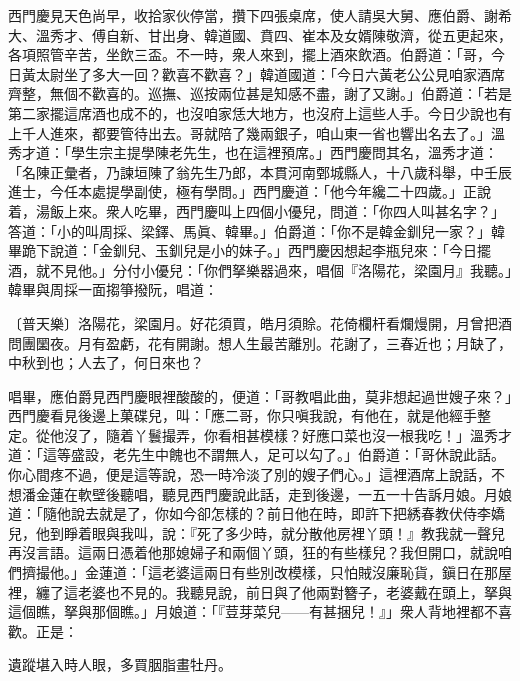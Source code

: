 西門慶見天色尚早，收拾家伙停當，攢下四張桌席，使人請吳大舅、應伯爵、謝希大、溫秀才、傅自新、甘出身、韓道國、賁四、崔本及女婿陳敬濟，從五更起來，各項照管辛苦，坐飲三盃。不一時，衆人來到，擺上酒來飲酒。伯爵道：「哥，今日黃太尉坐了多大一回？歡喜不歡喜？」韓道國道：「今日六黃老公公見咱家酒席齊整，無個不歡喜的。巡撫、巡按兩位甚是知感不盡，謝了又謝。」伯爵道：「若是第二家擺這席酒也成不的，也沒咱家恁大地方，也沒府上這些人手。今日少說也有上千人進來，都要管待出去。哥就陪了幾兩銀子，咱山東一省也響出名去了。」溫秀才道：「學生宗主提學陳老先生，也在這裡預席。」{}西門慶問其名，溫秀才道：「名陳正彙者，乃諫垣陳了翁先生乃郎，本貫河南鄄城縣人，十八歲科舉，中壬辰進士，今任本處提學副使，極有學問。」西門慶道：「他今年纔二十四歲。」正說着，湯飯上來。衆人吃畢，西門慶叫上四個小優兒，問道：「你四人叫甚名字？」答道：「小的叫周採、梁鐸、馬眞、韓畢。」伯爵道：「你不是韓金釧兒一家？」韓畢跪下說道：「金釧兒、玉釧兒是小的妹子。」西門慶因想起李瓶兒來：「今日擺酒，就不見他。」分付小優兒：「你們拏樂器過來，唱個『洛陽花，梁園月』我聽。」韓畢與周採一面搊箏撥阮，唱道：

\begin{myquote} 
{\markfont\small{〔普天樂〕}}洛陽花，梁園月。好花須買，皓月須賒。花倚欄杆看爛熳開，月曾把酒問團圞夜。月有盈虧，花有開謝。想人生最苦離別。花謝了，三春近也；月缺了，中秋到也；人去了，何日來也？{}
\end{myquote} 

唱畢，應伯爵見西門慶眼裡酸酸的，便道：「哥教唱此曲，莫非想起過世嫂子來？」西門慶看見後邊上菓碟兒，叫：「應二哥，你只嗔我說，有他在，就是他經手整定。從他沒了，隨着丫鬟撮弄，你看相甚模樣？好應口菜也沒一根我吃！」{}溫秀才道：「這等盛設，老先生中餽也不謂無人，足可以勾了。」伯爵道：「哥休說此話。你心間疼不過，便是這等說，恐一時冷淡了別的嫂子們心。」{}這裡酒席上說話，不想潘金蓮在軟壁後聽唱，聽見西門慶說此話，走到後邊，一五一十告訴月娘。月娘道：「隨他說去就是了，你如今卻怎樣的？前日他在時，即許下把綉春教伏侍李嬌兒，他到睜着眼與我叫，說：『死了多少時，就分散他房裡丫頭！』教我就一聲兒再沒言語。這兩日憑着他那媳婦子和兩個丫頭，狂的有些樣兒？我但開口，就說咱們擠撮他。」金蓮道：「這老婆這兩日有些別改模樣，只怕賊沒廉恥貨，鎭日在那屋裡，纏了這老婆也不見的。我聽見說，前日與了他兩對簪子，老婆戴在頭上，拏與這個瞧，拏與那個瞧。」月娘道：「『荳芽菜兒——有甚捆兒！』」衆人背地裡都不喜歡。正是：

\begin{myquote} 
遺蹤堪入時人眼，多買胭脂畫牡丹。
\end{myquote} 

